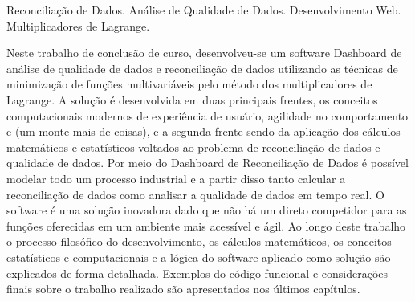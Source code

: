 \documentclass[tcc/eca]{faeng}
\begin{document}
\begin{resumo}{Reconciliação de Dados. Análise de Qualidade de Dados. Desenvolvimento Web. Multiplicadores de Lagrange.}

Neste trabalho de conclusão de curso, desenvolveu-se um software Dashboard de análise de qualidade de dados e reconciliação de dados utilizando as técnicas de minimização de funções multivariáveis pelo método dos multiplicadores de Lagrange. A solução é desenvolvida em duas principais frentes, os conceitos computacionais modernos de experiência de usuário, agilidade no comportamento e (um monte mais de coisas), e a segunda frente sendo da aplicação dos cálculos matemáticos e estatísticos voltados ao problema de reconciliação de dados e qualidade de dados. Por meio do Dashboard de Reconciliação de Dados é possível modelar todo um processo industrial e a partir disso tanto calcular a reconciliação de dados como analisar a qualidade de dados em tempo real. O software é uma solução inovadora dado que não há um direto competidor para as funções oferecidas em um ambiente mais acessível e ágil. Ao longo deste trabalho o processo filosófico do desenvolvimento, os cálculos matemáticos, os conceitos estatísticos e computacionais e a lógica do software aplicado como solução são explicados de forma detalhada. Exemplos do código funcional e considerações finais sobre o trabalho realizado são apresentados nos últimos capítulos.

\end{resumo}
\begin{abstract}{Data Reconciliation. Data Quality Analysis. Web Development. Lagrange Multipliers.}


In this final course project, a Dashboard software for data quality analysis and data reconciliation was developed using techniques of multivariable function minimization through the method of Lagrange multipliers. The solution is developed on two main fronts: modern computational concepts of user experience, behavioral agility, and various other aspects; and the second front involves the application of mathematical and statistical calculations focused on the problem of data reconciliation and data quality. Through the Data Reconciliation Dashboard, it is possible to model an entire industrial process and, consequently, both calculate data reconciliation and analyze data quality in real time. The software represents an innovative solution, given the absence of a direct competitor for the functions offered in a more accessible and agile environment. Throughout this work, the philosophical development process, mathematical calculations, statistical and computational concepts, and the logic of the applied software solution are explained in detail. Examples of functional code and final considerations about the work performed are presented in the last chapters.
	
\end{abstract}
\end{document}
